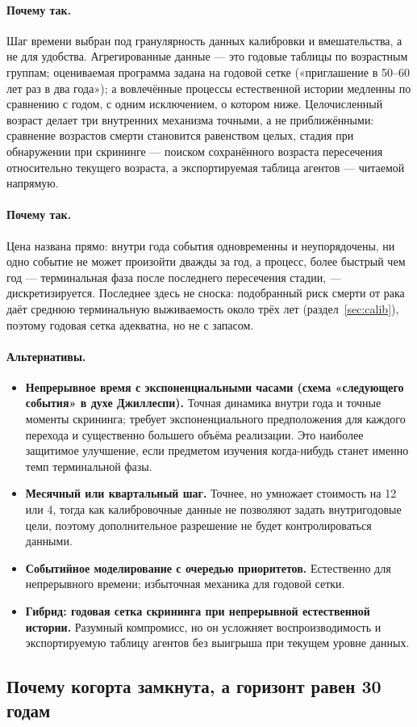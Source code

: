 \documentclass[12pt,a4paper]{article}
\newcommand{\why}[1]{\paragraph{Почему так.} #1}
\newcommand{\alt}[1]{\paragraph{Альтернативы.} #1}
\begin{document}
\why{Шаг времени выбран под гранулярность данных калибровки и вмешательства, а не для удобства. Агрегированные
данные --- это годовые таблицы по возрастным группам; оцениваемая программа задана на годовой сетке
(«приглашение в 50--60 лет раз в два года»); а вовлечённые процессы естественной истории медленны по
сравнению с годом, с одним исключением, о котором ниже. Целочисленный возраст делает три внутренних
механизма точными, а не приближёнными: сравнение возрастов смерти становится равенством целых, стадия при
обнаружении при скрининге --- поиском сохранённого возраста пересечения относительно текущего возраста, а
экспортируемая таблица агентов --- читаемой напрямую.}

\why{Цена названа прямо: внутри года события одновременны и неупорядочены, ни одно событие не может
произойти дважды за год, а процесс, более быстрый чем год --- терминальная фаза после последнего
пересечения стадии, --- дискретизируется. Последнее здесь не сноска: подобранный риск смерти от рака даёт
среднюю терминальную выживаемость около трёх лет (раздел~\ref{sec:calib}), поэтому годовая сетка адекватна,
но не с запасом.}

\alt{\begin{itemize}[nosep]
  \item \textbf{Непрерывное время с экспоненциальными часами (схема «следующего события» в духе
        Джиллеспи).} Точная динамика внутри года и точные моменты скрининга; требует экспоненциального
        предположения для каждого перехода и существенно большего объёма реализации. Это наиболее
        защитимое улучшение, если предметом изучения когда-нибудь станет именно темп терминальной фазы.
  \item \textbf{Месячный или квартальный шаг.} Точнее, но умножает стоимость на 12 или 4, тогда как
        калибровочные данные не позволяют задать внутригодовые цели, поэтому дополнительное разрешение не
        будет контролироваться данными.
  \item \textbf{Событийное моделирование с очередью приоритетов.} Естественно для непрерывного времени;
        избыточная механика для годовой сетки.
  \item \textbf{Гибрид: годовая сетка скрининга при непрерывной естественной истории.} Разумный
        компромисс, но он усложняет воспроизводимость и экспортируемую таблицу агентов без выигрыша при
        текущем уровне данных.
\end{itemize}}

\subsection{Почему когорта замкнута, а горизонт равен 30 годам}
\end{document}
